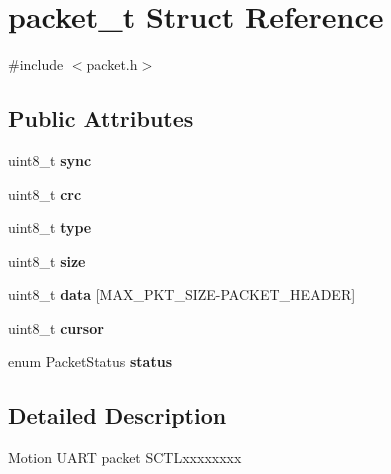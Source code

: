 \hypertarget{structpacket__t}{}\section{packet\+\_\+t Struct Reference}
\label{structpacket__t}


{\ttfamily \#include $<$packet.\+h$>$}

\subsection*{Public Attributes}
\begin{DoxyCompactItemize}
\item 
uint8\+\_\+t {\bfseries sync}\hypertarget{structpacket__t_a76553624e98cd50b114d0784abf2c7d5}{}\label{structpacket__t_a76553624e98cd50b114d0784abf2c7d5}

\item 
uint8\+\_\+t {\bfseries crc}\hypertarget{structpacket__t_a2d535881aafa6b7fe4bb93b6bf69989b}{}\label{structpacket__t_a2d535881aafa6b7fe4bb93b6bf69989b}

\item 
uint8\+\_\+t {\bfseries type}\hypertarget{structpacket__t_afa6fef69d5697c4e07fc8e582e2d578b}{}\label{structpacket__t_afa6fef69d5697c4e07fc8e582e2d578b}

\item 
uint8\+\_\+t {\bfseries size}\hypertarget{structpacket__t_accc302955ca1bc6f75c387b25001208e}{}\label{structpacket__t_accc302955ca1bc6f75c387b25001208e}

\item 
uint8\+\_\+t {\bfseries data} \mbox{[}M\+A\+X\+\_\+\+P\+K\+T\+\_\+\+S\+I\+ZE-\/P\+A\+C\+K\+E\+T\+\_\+\+H\+E\+A\+D\+ER\mbox{]}\hypertarget{structpacket__t_ad772e0b13e249e30cb343a9ffb769389}{}\label{structpacket__t_ad772e0b13e249e30cb343a9ffb769389}

\item 
uint8\+\_\+t {\bfseries cursor}\hypertarget{structpacket__t_afc53f1a0300d4f0b909296b20b7ec480}{}\label{structpacket__t_afc53f1a0300d4f0b909296b20b7ec480}

\item 
enum Packet\+Status {\bfseries status}\hypertarget{structpacket__t_a25fc56c4d2c72868ab500729ccfdc316}{}\label{structpacket__t_a25fc56c4d2c72868ab500729ccfdc316}

\end{DoxyCompactItemize}


\subsection{Detailed Description}
Motion U\+A\+RT packet S\+C\+T\+Lxxxxxxxx

